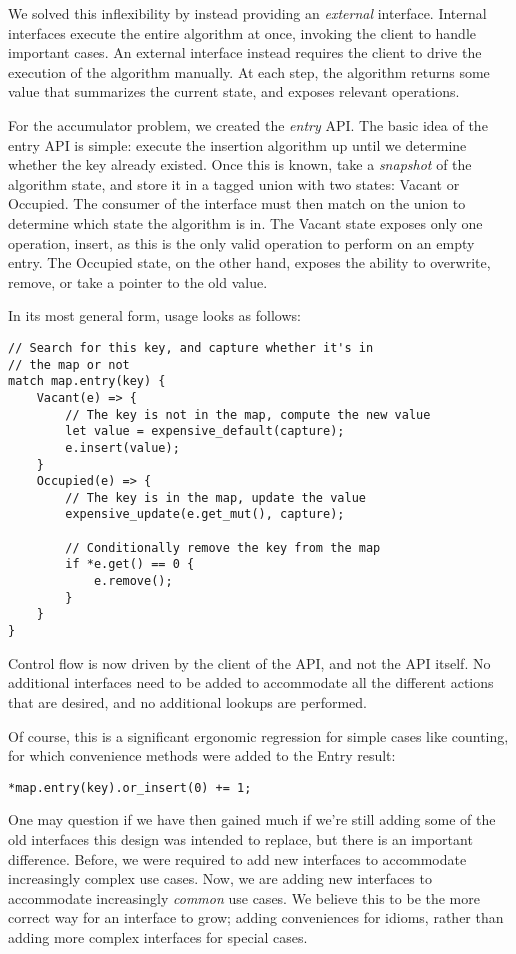 We solved this inflexibility by instead providing an \emph{external} interface.
Internal interfaces execute the entire algorithm at once, invoking the client to
handle important cases. An external interface instead requires the client to drive the
execution of the algorithm manually. At each step, the algorithm returns some
value that summarizes the current state, and exposes relevant operations.

For the accumulator problem, we created the \emph{entry} API. The basic idea of the
entry API is simple: execute the insertion algorithm up until we determine
whether the key already existed. Once this is known, take a \emph{snapshot} of
the algorithm state, and store it in a tagged union with two states: Vacant or
Occupied. The consumer of the interface must then match on the union to determine
which state the algorithm is in. The Vacant state exposes only one operation,
insert, as this is the only valid operation to perform on an empty entry.
The Occupied state, on the other hand, exposes the ability to overwrite, remove,
or take a pointer to the old value.

In its most general form, usage looks as follows:

\begin{verbatim}
// Search for this key, and capture whether it's in
// the map or not
match map.entry(key) {
    Vacant(e) => {
        // The key is not in the map, compute the new value
        let value = expensive_default(capture);
        e.insert(value);
    }
    Occupied(e) => {
        // The key is in the map, update the value
        expensive_update(e.get_mut(), capture);

        // Conditionally remove the key from the map
        if *e.get() == 0 {
            e.remove();
        }
    }
}
\end{verbatim}

Control flow is now driven by the client of the API, and not the API itself.
No additional interfaces need to be added to accommodate all the different
actions that are desired, and no additional lookups are performed.

Of course, this is a significant ergonomic regression for simple cases like
counting, for which convenience methods were added to the Entry result:

\begin{verbatim}
*map.entry(key).or_insert(0) += 1;
\end{verbatim}

One may question if we have then gained much if we're still adding some of
the old interfaces this design was intended to replace, but there is an important
difference. Before, we were required to add new interfaces to accommodate increasingly
complex use cases. Now, we are adding new interfaces to accommodate increasingly
\emph{common} use cases. We believe this to be the more correct way for an interface to
grow; adding conveniences for idioms, rather than adding more complex interfaces
for special cases.

